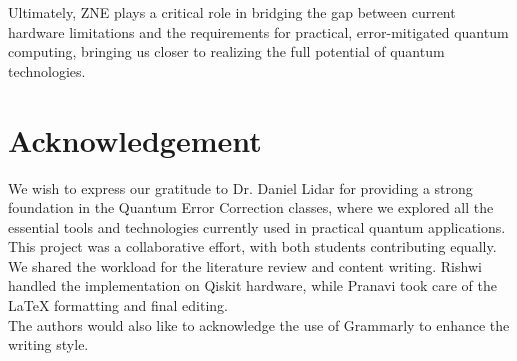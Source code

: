 \documentclass[12pt]{article}
\begin{document}
Ultimately, ZNE plays a critical role in bridging the gap between current hardware limitations and the requirements for practical, error-mitigated quantum computing, bringing us closer to realizing the full potential of quantum technologies.


\section{Acknowledgement}
We wish to express our gratitude to Dr. Daniel Lidar for providing a strong foundation in the Quantum Error Correction classes, where we explored all the essential tools and technologies currently used in practical quantum applications. \\
This project was a collaborative effort, with both students contributing equally. We shared the workload for the literature review and content writing. Rishwi handled the implementation on Qiskit hardware, while Pranavi took care of the LaTeX formatting and final editing. \\
The authors would also like to acknowledge the use of Grammarly to enhance the writing style.




\end{document}
